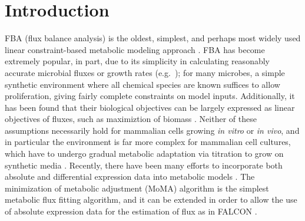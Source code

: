 \section{Introduction}

%
%
FBA (flux balance analysis) is the oldest, simplest, and perhaps
most widely used linear constraint-based metabolic modeling approach
\citep{Shestov2013a,Lewis2012}. FBA has become extremely popular, in
part, due to its simplicity in calculating reasonably accurate
microbial fluxes or growth rates
(e.g.\ \citealt{Schuetz2012,Fong2004_sb2013}); for
many microbes, a simple synthetic environment where all chemical
species are known suffices to allow proliferation, giving fairly
complete constraints on model inputs. Additionally, it has been found
that their biological objectives can be largely expressed as linear
objectives of fluxes, such as maximiztion of biomass \citep{Schuetz2012}. 
Neither of these assumptions necessarily hold for mammalian cells growing \textit{in
  vitro} or \textit{in vivo}, and in particular the environment is far
more complex for mammalian cell cultures, which have to undergo
gradual metabolic adaptation via titration to grow on synthetic media
\citep{Pirkmajer2011}. Recently, there have been many efforts to
incorporate both absolute and differential expression data into
metabolic models \citep{Blazier2012}. The minimization of metabolic
adjustment (MoMA) algorithm is the simplest metabolic flux fitting
algorithm, and it can be extended in order to allow the use of
absolute expression data for the estimation of flux as in FALCON
\citep{Segre2002,Lee2012}.


